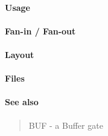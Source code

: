 \paragraph{Usage}

\paragraph{Fan-in / Fan-out}

\paragraph{Layout}

\paragraph{Files}

\paragraph{See also}
\begin{quote}
    BUF - a Buffer gate
\end{quote}
